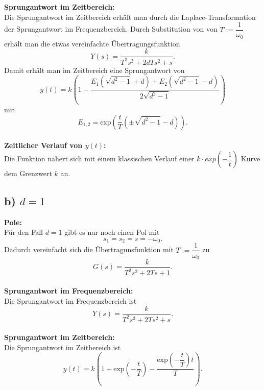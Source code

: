\documentclass[11pt]{scrartcl} %
\begin{document}
\textbf{Sprungantwort im Zeitbereich:}\\
Die Sprungantwort im Zeitbereich erhält man durch die Laplace-Transformation der Sprungantwort im Frequenzbereich. Durch Substitution von von $T:=\dfrac{1}{\omega_0}$ erhält man die etwas vereinfachte Übertragungsfunktion
\begin{equation*}
Y(s)=\dfrac{k}{T^2s^3+2dTs^2+s}.
\end{equation*}
Damit erhält man im Zeitbereich eine Sprungantwort von
\begin{equation*}
y(t) = k \left(1-\dfrac{E_1\left(\sqrt{d^2-1}+d\right) + E_2\left(\sqrt{d^2-1}-d\right)}{2 \sqrt{d^2-1}}\right)
\end{equation*}
mit
\begin{equation*}
E_{1,2} = \text{exp}\left(\dfrac{t}{T}\left(\pm\sqrt{d^2-1}-d\right)\right).
\end{equation*}\\

\textbf{Zeitlicher Verlauf von $y(t)$:}\\
Die Funktion nähert sich mit einem klassischen Verlauf einer $k \cdot exp\left(-\dfrac{1}{t}\right)$ Kurve dem Grenzwert $k$ an.

\subsection*{b) $d=1$}
\textbf{Pole:}\\
Für den Fall $d=1$ gibt es nur noch einen Pol mit
\begin{equation*}
s_1 = s_2 = s = -\omega_0.
\end{equation*}
Dadurch vereinfacht sich die Übertragunsfunktion mit $T:=\dfrac{1}{\omega_0}$ zu
\begin{equation*}
G(s) = \dfrac{k}{T^2s^2+2Ts+1}.
\end{equation*} \\

\textbf{Sprungantwort im Frequenzbereich:}\\
Die Sprungantwort im Frequenzbereich ist
\begin{equation*}
Y(s)=\dfrac{k}{T^2s^3+2Ts^2+s}.
\end{equation*} \\

\textbf{Sprungantwort im Zeitbereich:}\\
Die Sprungantwort im Zeitbereich ist
\begin{equation*}
y(t)=k \left( 1-\text{exp}\left( -\dfrac{t}{T} \right) - \dfrac{\text{exp}\left( -\dfrac{t}{T} \right)t}{T} \right).
\end{equation*}\\
\end{document}
